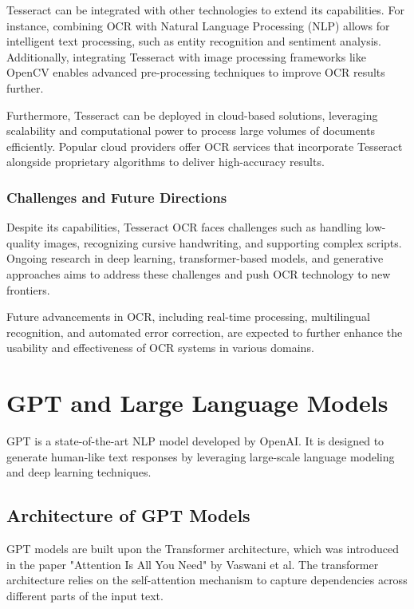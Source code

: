 Tesseract can be integrated with other technologies to extend its capabilities. For instance, combining OCR with Natural Language Processing (NLP) allows for intelligent text processing, such as entity recognition and sentiment analysis. Additionally, integrating Tesseract with image processing frameworks like OpenCV enables advanced pre-processing techniques to improve OCR results further.

Furthermore, Tesseract can be deployed in cloud-based solutions, leveraging scalability and computational power to process large volumes of documents efficiently. Popular cloud providers offer OCR services that incorporate Tesseract alongside proprietary algorithms to deliver high-accuracy results.

\subsubsection{Challenges and Future Directions}

Despite its capabilities, Tesseract OCR faces challenges such as handling low-quality images, recognizing cursive handwriting, and supporting complex scripts. Ongoing research in deep learning, transformer-based models, and generative approaches aims to address these challenges and push OCR technology to new frontiers.

Future advancements in OCR, including real-time processing, multilingual recognition, and automated error correction, are expected to further enhance the usability and effectiveness of OCR systems in various domains.





\section{GPT and Large Language Models}

GPT is a state-of-the-art NLP model developed by OpenAI. It is designed to generate human-like text responses by leveraging large-scale language modeling and deep learning techniques.

\subsection{Architecture of GPT Models}

GPT models are built upon the Transformer architecture, which was introduced in the paper "Attention Is All You Need" by Vaswani et al. The transformer architecture relies on the self-attention mechanism to capture dependencies across different parts of the input text.

